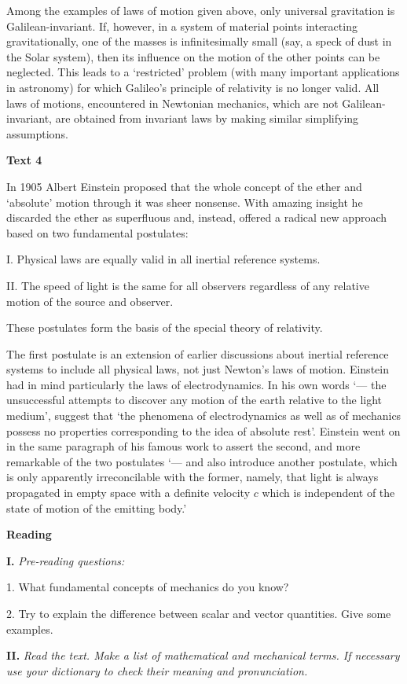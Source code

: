\documentclass[a4paper]{article}
\newcounter{EUnits}
\newcommand{\EUnit}{\par\medskip{\huge \textbf{Unit \arabic{EUnits}}}\par\stepcounter{EUnits}}
\newcommand{\ESect}[1]{\medskip\par{\large \textbf{#1}}\par}
\newcommand{\ETask}[2]{\medskip\par\textbf{#1.} \textit{#2}\par}
\begin{document}
Among the examples of laws of motion given above, only universal gravitation is Galilean-invariant. If, however, in a system of
material points interacting gravitationally, one of the masses is infinitesimally small (say, a speck of dust in the Solar
system), then its influence on the motion of the other points can be neglected. This leads to a `restricted' problem (with
many important applications in astronomy) for which Galileo's principle of relativity is no longer valid. All laws of motions,
encountered in Newtonian mechanics, which are not Galilean-invariant, are obtained from invariant laws by making similar
simplifying assumptions.

\ESect{Text 4}
In 1905 Albert Einstein proposed that the whole concept of the ether and `absolute' motion through it was sheer nonsense.
With amazing insight he discarded the ether as superfluous and, instead, offered a radical new approach based on two fundamental
postulates:

I. Physical laws are equally valid in all inertial reference systems.

II. The speed of light is the same for all observers regardless of any relative motion of the source and observer.

These postulates form the basis of the special theory of relativity.

The first postulate is an extension of earlier discussions about inertial reference systems to include all physical laws,
not just Newton's laws of motion. Einstein had in mind particularly the laws of electrodynamics. In his own words
`--- the unsuccessful attempts to discover any motion of the earth relative to the light medium', suggest that `the
phenomena of electrodynamics as well as of mechanics possess no properties corresponding to the idea of absolute rest'.
Einstein went on in the same paragraph of his famous work to assert the second, and more remarkable of the two postulates
`--- and also introduce another postulate, which is only apparently irreconcilable with the former, namely, that light
is always propagated in empty space with a definite velocity $c$ which is independent of the state of motion of the emitting body.'

\EUnit
\ESect{Reading}

\ETask{I}{Pre-reading questions:}
1. What fundamental concepts of mechanics do you know?

2. Try to explain the difference between scalar and vector quantities. Give some examples.

\ETask{II}{Read the text. Make a list of mathematical and mechanical terms. If necessary use your dictionary to check
their meaning and pronunciation.}
\end{document}
